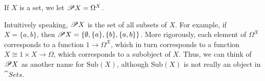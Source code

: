 





\newcommand{\sub}[1]{\mathrm{Sub}(#1)}

\begin{defn}[Powerset] If $X$ is a set, we let $\mathscr P X =\Omega
  ^X$.  \end{defn}

Intuitively speaking, $\mathscr P X$ is the set of all subsets of $X$.  For
example, if $X=\{ a,b\}$, then $\mathscr P X=\{ \emptyset ,\{a \} ,\{ b\} ,\{
a,b\} \}$.  More rigorously, each element of $\Omega ^X$ corresponds
to a function $1\to \Omega ^X$, which in turn corresponds to a
function $X\cong 1\times X\to\Omega$, which corresponds to a subobject
of $X$.  Thus, we can think of $\mathscr P X$ as another name for $\sub{X}$,
although $\sub{X}$ is not really an object in $\cat{Sets}$.








